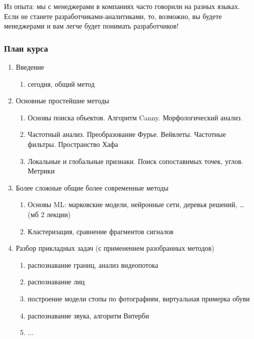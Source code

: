 \documentclass[main.tex]{subfiles}
\begin{document}
Из опыта: мы с менеджерами в компаниях часто говорили на разных языках.
Если не станете разработчиками-аналитиками, то, возможно, вы будете менеджерами и вам легче будет понимать разработчиков!

\subsubsection{План курса}

\begin{enumerate}[noitemsep]
    \item Введение
    \begin{enumerate}[noitemsep]
        \item сегодня, общий метод
    \end{enumerate}
    \item Основные простейшие методы
    \begin{enumerate}[noitemsep]
        \item Основы поиска объектов. Алгоритм Canny. Морфологический анализ.
        \item Частотный анализ. Преобразование Фурье. Вейвлеты. Частотные фильтры. Пространство Хафа
        \item Локальные и глобальные признаки. Поиск сопоставимых точек, углов. Метрики
    \end{enumerate}
    \item Более сложные общие более современные методы
    \begin{enumerate}[noitemsep]
        \item Основы ML: марковские модели, нейронные сети, деревья решений, … (мб 2 лекции)
        \item Кластеризация, сравнение фрагментов сигналов
    \end{enumerate}
    \item Разбор прикладных задач (с применением разобранных методов)
    \begin{enumerate}[noitemsep]
        \item распознавание границ, анализ видеопотока
        \item распознавание лиц
        \item построение модели стопы по фотографиям, виртуальная примерка обуви
        \item распознавание звука, алгоритм Витерби
        \item ...
    \end{enumerate}
\end{enumerate}
\end{document}

